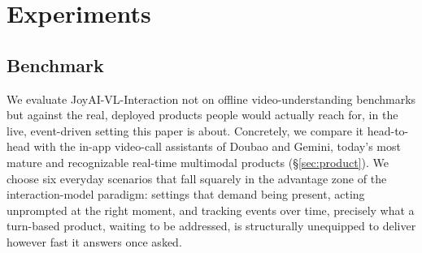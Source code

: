 \section{Experiments}
\label{sec:experiments}
\subsection{Benchmark}\label{sec:benchmark}
We evaluate JoyAI-VL-Interaction not on offline video-understanding benchmarks but against the real, deployed products people would actually reach for, in the live, event-driven setting this paper is about. Concretely, we compare it head-to-head with the in-app video-call assistants of Doubao and Gemini, today's most mature and recognizable real-time multimodal products (\S\ref{sec:product}). We choose six everyday scenarios that fall squarely in the advantage zone of the interaction-model paradigm: settings that demand being present, acting unprompted at the right moment, and tracking events over time, precisely what a turn-based product, waiting to be addressed, is structurally unequipped to deliver however fast it answers once asked.

